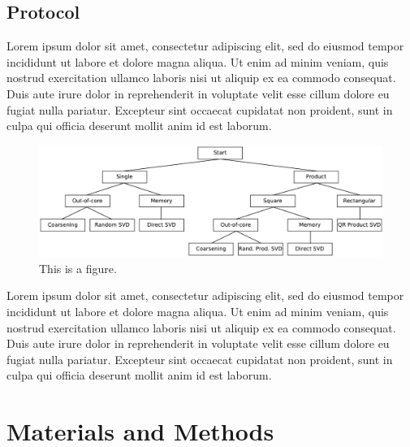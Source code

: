 \documentclass[ijgi,article,submit,moreauthors,pdftex,10pt,a4paper]{Definitions/mdpi}
\begin{document}
\subsection{Protocol}
\label{sec:Introduction/Protocol}

Lorem ipsum dolor sit amet, consectetur adipiscing elit, sed do eiusmod tempor incididunt ut labore et dolore magna aliqua. Ut enim ad minim veniam, quis nostrud exercitation ullamco laboris nisi ut aliquip ex ea commodo consequat. Duis aute irure dolor in reprehenderit in voluptate velit esse cillum dolore eu fugiat nulla pariatur. Excepteur sint occaecat cupidatat non proident, sunt in culpa qui officia deserunt mollit anim id est laborum.

\begin{figure}[H]
\centering
\includegraphics[width=120mm]{Results/FlowDiagram.pdf}
\caption{This is a figure.}
\label{fig:FlowDiagram}
\end{figure}

Lorem ipsum dolor sit amet, consectetur adipiscing elit, sed do eiusmod tempor incididunt ut labore et dolore magna aliqua. Ut enim ad minim veniam, quis nostrud exercitation ullamco laboris nisi ut aliquip ex ea commodo consequat. Duis aute irure dolor in reprehenderit in voluptate velit esse cillum dolore eu fugiat nulla pariatur. Excepteur sint occaecat cupidatat non proident, sunt in culpa qui officia deserunt mollit anim id est laborum.

\section{Materials and Methods}
\label{sec:Materials and Methods}

\end{document}
